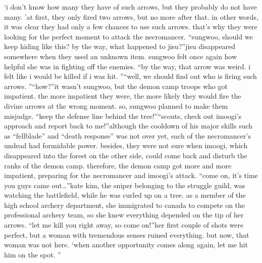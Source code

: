 ‘i don’t know how many they have of such arrows, but they probably do not have many.
’at first, they only fired two arrows, but no more after that.
in other words, it was clear they had only a few chances to use such arrows.
 that’s why they were looking for the perfect moment to attack the necromancer.
“sungwoo, should we keep hiding like this? by the way, what happened to jisu?”jisu disappeared somewhere when they used an unknown item.
 sungwoo felt once again how helpful she was in fighting off the enemies.
“by the way, that arrow was weird.
 i felt like i would be killed if i was hit.
”“well, we should find out who is firing such arrows.
”“how?”it wasn’t sungwoo, but the demon camp troops who got impatient.
 the more impatient they were, the more likely they would fire the divine arrows at the wrong moment.
so, sungwoo planned to make them misjudge.
“keep the defense line behind the tree!”“scouts, check out imoogi’s approach and report back to me!”although the cooldown of his major skills such as “fellblade” and “death response” was not over yet, each of the necromancer’s undead had formidable power.
besides, they were not sure when imoogi, which disappeared into the forest on the other side, could come back and disturb the ranks of the demon camp.
therefore, the demon camp got more and more impatient, preparing for the necromancer and imoogi’s attack.
“come on, it’s time you guys came out…”kate kim, the sniper belonging to the struggle guild, was watching the battlefield, while he was curled up on a tree.
as a member of the high school archery department, she immigrated to canada to compete on the professional archery team, so she knew everything depended on the tip of her arrows.
“let me kill you right away, so come on!”her first couple of shots were perfect, but a woman with tremendous senses ruined everything.
but now, that woman was not here.
‘when another opportunity comes along again, let me hit him on the spot.
”

 